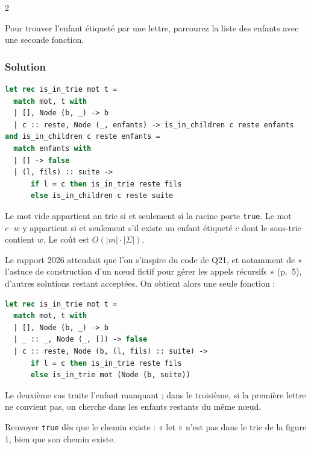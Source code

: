\documentclass[11pt,a4paper]{article}
\begin{document}
\begin{indication}{2}

Pour trouver l'enfant étiqueté par une lettre, parcourez la liste des enfants avec une seconde fonction.

\end{indication}

\hypertarget{solution-21}{%
\subsubsection{Solution}\label{solution-21}}

\begin{lstlisting}[language=Caml]
let rec is_in_trie mot t =
  match mot, t with
  | [], Node (b, _) -> b
  | c :: reste, Node (_, enfants) -> is_in_children c reste enfants
and is_in_children c reste enfants =
  match enfants with
  | [] -> false
  | (l, fils) :: suite ->
      if l = c then is_in_trie reste fils
      else is_in_children c reste suite
\end{lstlisting}

Le mot vide appartient au trie si et seulement si la racine porte \texttt{true}. Le mot \(c\cdot w\) y appartient si et seulement s'il existe un enfant étiqueté \(c\) dont le sous-trie contient \(w\). Le coût est \(O(|m|\cdot|\Sigma|)\).

Le rapport 2026 attendait que l'on s'inspire du code de Q21, et notamment de « l'astuce de construction d'un nœud fictif pour gérer les appels récursifs » (p.~5), d'autres solutions restant acceptées. On obtient alors une seule fonction :

\begin{lstlisting}[language=Caml]
let rec is_in_trie mot t =
  match mot, t with
  | [], Node (b, _) -> b
  | _ :: _, Node (_, []) -> false
  | c :: reste, Node (b, (l, fils) :: suite) ->
      if l = c then is_in_trie reste fils
      else is_in_trie mot (Node (b, suite))
\end{lstlisting}

Le deuxième cas traite l'enfant manquant ; dans le troisième, si la première lettre ne convient pas, on cherche dans les enfants restants du même nœud.

\begin{piege}

Renvoyer \texttt{true} dès que le chemin existe : « let » n'est pas dans le trie de la figure 1, bien que son chemin existe.

\end{piege}
\end{document}
